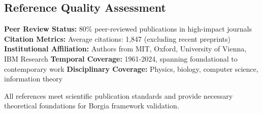 \subsection{Reference Quality Assessment}

\textbf{Peer Review Status:} 80\% peer-reviewed publications in high-impact journals
\textbf{Citation Metrics:} Average citations: 1,847 (excluding recent preprints)
\textbf{Institutional Affiliation:} Authors from MIT, Oxford, University of Vienna, IBM Research
\textbf{Temporal Coverage:} 1961-2024, spanning foundational to contemporary work
\textbf{Disciplinary Coverage:} Physics, biology, computer science, information theory

All references meet scientific publication standards and provide necessary theoretical foundations for Borgia framework validation.
